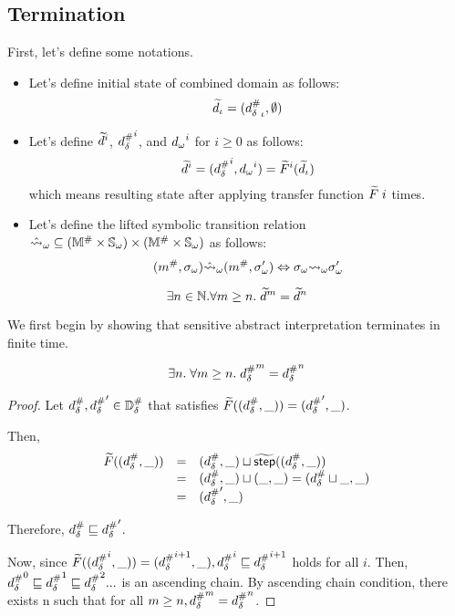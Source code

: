 \subsection{Termination}

First, let's define some notations.

\begin{itemize}
\item
Let's define initial state of combined domain as follows:
\[
  \widetilde{d}_\iota = ({{d}^{\#}_\delta}_\iota, \emptyset)
\]
\item
Let's define $\widetilde{d}^i$, ${{d}^{\#}_\delta}^i$, and ${{d}_\omega}^i$ for $i \geq 0$ as follows:
\[
  \widetilde{d}^i = ({{d}^{\#}_\delta}^i, {{d}_\omega}^i) = \widetilde{F}^i(\widetilde{d}_\iota)
\]
which means resulting state after applying transfer function $\widetilde{F} \; i$ times.
\item
Let's define the lifted symbolic transition relation
$\hat{\leadsto}_\omega \subseteq
({\mathbb{M}}^{\#} \times {\mathbb{S}}_\omega) \times ({\mathbb{M}}^{\#} \times {\mathbb{S}}_\omega)$
as follows:
\[
  ({m}^{\#}, {\sigma}_\omega) \hat{\leadsto}_\omega ({m}^{\#}, {\sigma}_\omega') \Leftrightarrow
  {\sigma}_\omega {\leadsto}_\omega {\sigma}_\omega'
\]
\end{itemize}

\begin{theorem}[Termination]\label{theorem:termination}
  \[
    \exists n \in \mathbb{N}. \forall m \geq n. \;
    \widetilde{d}^m = \widetilde{d}^n
  \]
\end{theorem}

We first begin by showing that sensitive abstract interpretation terminates in
finite time.

\begin{lemma}\label{lemma:sabs-term}
\label{theorem:sabs-termination}
  \[
    \exists n. \; \forall m \geq n. \;
    {{d}^{\#}_\delta}^m = {{d}^{\#}_\delta}^n
  \]
\end{lemma}

\begin{proof}
Let ${{d}^{\#}_\delta}, {{d}^{\#}_\delta}' \in {\mathbb{D}}^{\#}_\delta$ that satisfies
$\widetilde{F}(({{d}^{\#}_\delta}, \_)) = ({{d}^{\#}_\delta}', \_)$.

Then,
\[
  \begin{array}{rcl}
  \widetilde{F}(({{d}^{\#}_\delta}, \_))
  &=& ({{d}^{\#}_\delta}, \_) \sqcup \widetilde{\textsf{step}}(({{d}^{\#}_\delta}, \_))\\
  &=& ({{d}^{\#}_\delta}, \_) \sqcup (\_, \_) = ({{d}^{\#}_\delta} \sqcup \_, \_)\\
  &=& ({{d}^{\#}_\delta}', \_)
  \end{array}
\]

Therefore, ${{d}^{\#}_\delta} \sqsubseteq {{d}^{\#}_\delta}'$.

Now, since $\widetilde{F}(({{d}^{\#}_\delta}^i, \_)) = ({{d}^{\#}_\delta}^{i+1}, \_),
{{d}^{\#}_\delta}^i \sqsubseteq {{d}^{\#}_\delta}^{i+1}$ holds for all $i$.
Then, ${{d}^{\#}_\delta}^0 \sqsubseteq {{d}^{\#}_\delta}^1 \sqsubseteq {{d}^{\#}_\delta}^2 ...$ is an ascending chain.
By ascending chain condition, there exists n such that
for all $m \geq n, {{d}^{\#}_\delta}^m = {{d}^{\#}_\delta}^n$.
\end{proof}

